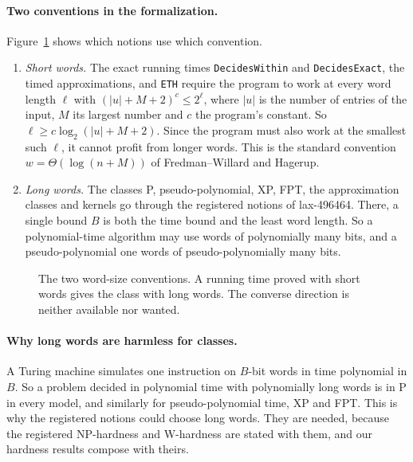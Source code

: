 \documentclass[11pt]{article}
\newcommand{\lean}[1]{\texttt{#1}}
\theoremstyle{definition}
\begin{document}
\paragraph{Two conventions in the formalization.} Figure~\ref{fig:words} shows
which notions use which convention.
\begin{enumerate}[leftmargin=*]
\item \emph{Short words.} The exact running times \lean{DecidesWithin} and
\lean{DecidesExact}, the timed approximations, and \lean{ETH} require the
program to work at every word length $\ell$ with
$(|u|+M+2)^c\le 2^\ell$, where $|u|$ is the number of entries of the input,
$M$ its largest number and $c$ the program's constant. So
$\ell\ge c\log_2(|u|+M+2)$. Since the program must also work at the smallest
such $\ell$, it cannot profit from longer words. This is the standard
convention $w = \Theta(\log(n+M))$ of Fredman--Willard and Hagerup.
\item \emph{Long words.} The classes P, pseudo-polynomial, XP, FPT, the
approximation classes and kernels go through the registered notions of
lax-496464. There, a single bound $B$ is both the time bound and the least word
length. So a polynomial-time algorithm may use words of polynomially many bits,
and a pseudo-polynomial one words of pseudo-polynomially many bits.
\end{enumerate}

\begin{figure}[ht]
\centering
{}
\caption{The two word-size conventions. A running time proved with short words gives
the class with long words. The converse direction is neither available nor
wanted.}
\label{fig:words}
\end{figure}

\paragraph{Why long words are harmless for classes.} A Turing machine
simulates one instruction on $B$-bit words in time polynomial in $B$. So a
problem decided in polynomial time with polynomially long words is in P in
every model, and similarly for pseudo-polynomial time, XP and FPT. This is why
the registered notions could choose long words. They are needed, because the
registered NP-hardness and W-hardness are stated with them, and our hardness
results compose with theirs.
\end{document}
